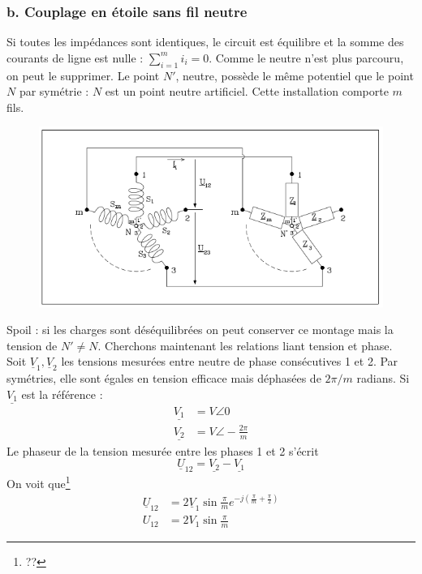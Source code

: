 \subsubsection{b. Couplage en étoile sans fil neutre}
Si toutes les impédances sont identiques, le circuit est équilibre et 
la somme des courants de ligne est nulle : $\sum_{i=1}^m i_i=0$. Comme 
le neutre n'est plus parcouru, on peut le supprimer. Le point $N'$, 
neutre, possède le même potentiel que le point $N$ par symétrie : $N$ 
est un point neutre artificiel. Cette installation comporte $m$ fils.\\
\begin{figure}
	\vspace{-8mm}
	\includegraphics[scale=0.4]{ch1/image7.png}
\end{figure}		
Spoil : si les charges sont déséquilibrées on peut conserver ce montage 
mais la tension de $N' \neq N$. Cherchons maintenant les relations liant 
tension et phase.\\
Soit $\underline{V}_1, \underline{V}_2$ les tensions mesurées entre 
neutre de phase consécutives 1 et 2. Par symétries, elle sont égales 
en tension efficace mais déphasées de $2\pi/m$ radians. Si $\underline{
V_1}$ est la référence :
\begin{equation}
	\begin{array}{ll}
		\underline{V_1} & = V\angle 0               \\
		\underline{V_2} & = V\angle -\frac{2\pi}{m} 
	\end{array}
\end{equation}
Le phaseur de la tension mesurée entre les phases 1 et 2 s'écrit
\begin{equation}
	\underline{U}_{12} = \underline{V_2}-\underline{V_1}
\end{equation}
On voit que\footnote{??} 
\begin{equation}
	\begin{array}{ll}
		\underline{U}_{12} & = 2\underline{V}_1\sin \frac{\pi}{m}e^{-j\left( 
		\frac{\pi}{m}+\frac{\pi}{2}\right)}\\
		U_{12}             & = 2V_1\sin\frac{\pi}{m}                         
	\end{array}
\end{equation}
		
